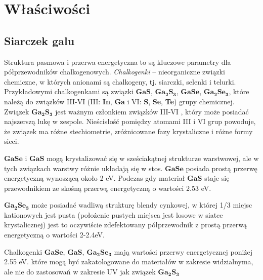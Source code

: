 \newpage

\section{Właściwości}

\subsection{Siarczek galu}
Struktura pasmowa i przerwa energetyczna to są kluczowe parametry dla półprzewodników chalkogenowych. \textit{Chalkogenki} – nieorganiczne związki chemiczne, w których anionami są chalkogeny, tj. siarczki, selenki i telurki. Przykładowymi chalkogenkami są związki $\mathbf{GaS}$, $\mathbf{Ga_{2}S_{3}}$, $\mathbf{GaSe}$, $\mathbf{Ga_{2}Se_{3}}$, które należą do związków III-VI (III: \textbf{In}, \textbf{Ga} i VI: \textbf{S}, \textbf{Se}, \textbf{Te}) grupy chemicznej. Związek $\mathbf{Ga_{2}S_{3}}$ jest ważnym członkiem związków III-VI , który może posiadać najszerszą lukę w zespole. Nieścisłość pomiędzy atomami III i VI grup powoduje, że związek ma różne stechiometrie, zróżnicowane fazy krystaliczne i różne formy sieci.

$\mathbf{GaSe}$ i $\mathbf{GaS}$ mogą krystalizować się w sześciakątnej strukturze warstwowej, ale w tych związkach warstwy różnie układają się w stos. $\mathbf{GaSe}$ posiada prostą przerwę energetyczną wynoszącą około 2 eV. Podczas gdy materiał $\mathbf{GaS}$ staje się przewodnikiem ze skośną przerwą energetyczną o wartości 2.53 eV.

$\mathbf{Ga_{2}Se_{3}}$ może posiadać wadliwą strukturę blendy cynkowej, w której 1/3 miejsc kationowych jest pusta (położenie pustych miejsca jest losowe w siatce krystalicznej) jest to oczywiście zdefektowany półprzewodnik z prostą przerwą energetyczną o wartości 2-2.4eV.

Chalkogenki $\mathbf{GaSe}$, $\mathbf{GaS}$, $\mathbf{Ga_{2}Se_{3}}$ mają wartości przerwy energetycznej poniżej 2.55 eV. które mogą być zakatologowane do materiałów w zakresie widzialnyma, ale nie do zastosowań w zakresie UV jak związek $\mathbf{Ga_{2}S_{3}}$

